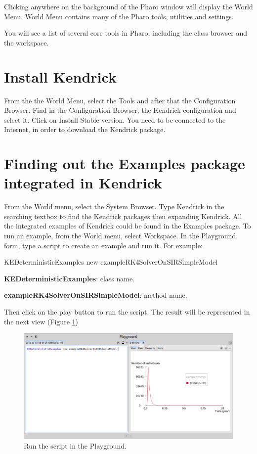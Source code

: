 \documentclass[a4paper,10pt,twoside]{book}
\begin{document}
Clicking anywhere on the background of the Pharo window will display the
World Menu. World Menu contains many of the Pharo tools, utilities and settings.

You will see a list of several core tools in Pharo, including the class browser
and the workspace.
\section{Install Kendrick}
From the the World Menu, select the Tools and after that the Configuration Browser.
Find in the Configuration Browser, the Kendrick configuration and select it. Click on Install Stable version.
You need to be connected to the Internet, in order to download the Kendrick package.
\section{Finding out the Examples package integrated in Kendrick}
From the World menu, select the System Browser.
Type Kendrick in the searching textbox to find the Kendrick packages then expanding Kendrick.
All the integrated examples of Kendrick could be found in the Examples package.
To run an example, from the World menu, select Workspace. In the Playground form, type a script to create an example and run it.
For example:

\begin{code}{}
KEDeterministicExamples new exampleRK4SolverOnSIRSimpleModel
\end{code}

\textbf{KEDeterministicExamples}: class name.

\textbf{exampleRK4SolverOnSIRSimpleModel}: method name.

Then click on the play button to run the script. The result will be represented in the next view (Figure \ref{Playground})


\begin{figure}

\begin{center}
\includegraphics[width=1.0\textwidth]{figures/Playground.png}\caption{Run the script in the Playground.\label{Playground}}\end{center}
\end{figure}
\end{document}
